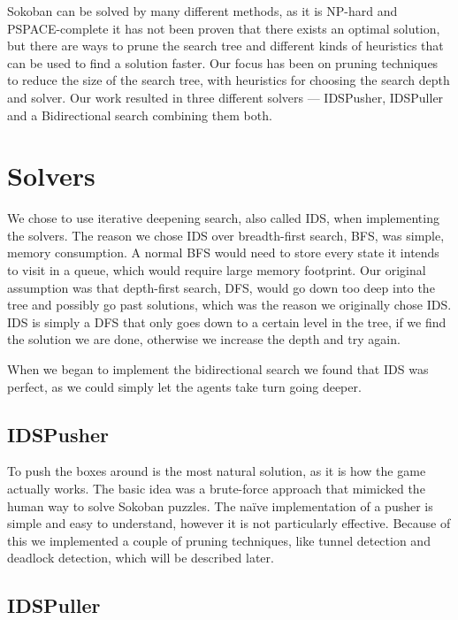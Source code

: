 \documentclass[a4paper,11pt]{article}
\renewcommand{\*}[0]{\cdot}
\begin{document}

Sokoban can be solved by many different methods, as it is NP-hard and
PSPACE-complete it has not been proven that there exists an optimal solution,
but there are ways to prune the search tree and different kinds of heuristics
that can be used to find a solution faster. Our focus has been on pruning
techniques to reduce the size of the search tree, with heuristics for choosing
the search depth and solver. Our work resulted in three different solvers ---
IDSPusher, IDSPuller and a Bidirectional search combining them both.


\section{Solvers}

We chose to use iterative deepening search, also called IDS, when
implementing the solvers. The reason we chose IDS over breadth-first search,
BFS,  was simple, memory consumption. A normal BFS would need to store every
state it intends to visit in a queue, which would require large memory
footprint. Our original assumption was that depth-first search, DFS, would go
down too deep into the tree and possibly go past solutions, which was the
reason we originally chose IDS. IDS is simply a DFS that only goes down to a
certain level in the tree, if we find the solution we are done, otherwise we
increase the depth and try again.

When we began to implement the bidirectional search we found that IDS was
perfect, as we could simply let the agents take turn going deeper.

\subsection{IDSPusher}

To push the boxes around is the most natural solution, as it is how the game
actually works. The basic idea was a brute-force approach that mimicked the
human way to solve Sokoban puzzles. The naïve implementation of a pusher is
simple and easy to understand, however it is not particularly effective.
Because of this we implemented a couple of pruning techniques, like tunnel
detection and deadlock detection, which will be described later.

\subsection{IDSPuller}
\end{document}
